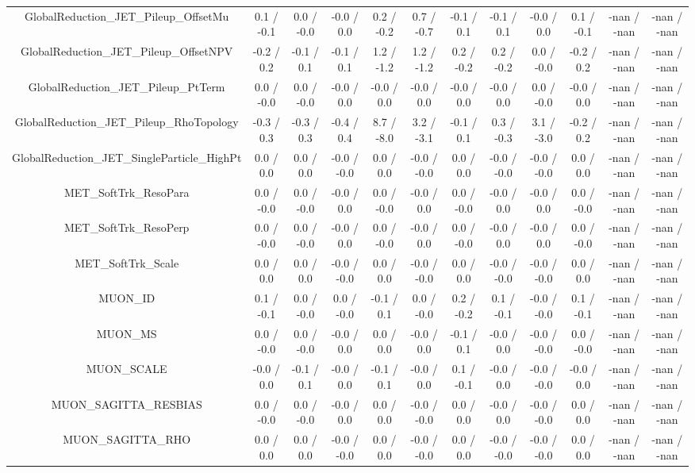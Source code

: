 \begin{table}[htbp]
\begin{center}
\begin{tabular}{|c|c|c|c|c|c|c|c|c|c|c|c|}
  GlobalReduction_JET_Pileup_OffsetMu & 0.1 / -0.1 & 0.0 / -0.0 & -0.0 / 0.0 & 0.2 / -0.2 & 0.7 / -0.7 & -0.1 / 0.1 & -0.1 / 0.1 & -0.0 / 0.0 & 0.1 / -0.1 & -nan / -nan & -nan / -nan \\ 
  GlobalReduction_JET_Pileup_OffsetNPV & -0.2 / 0.2 & -0.1 / 0.1 & -0.1 / 0.1 & 1.2 / -1.2 & 1.2 / -1.2 & 0.2 / -0.2 & 0.2 / -0.2 & 0.0 / -0.0 & -0.2 / 0.2 & -nan / -nan & -nan / -nan \\ 
  GlobalReduction_JET_Pileup_PtTerm & 0.0 / -0.0 & 0.0 / -0.0 & -0.0 / 0.0 & -0.0 / 0.0 & -0.0 / 0.0 & -0.0 / 0.0 & -0.0 / 0.0 & 0.0 / -0.0 & -0.0 / 0.0 & -nan / -nan & -nan / -nan \\ 
  GlobalReduction_JET_Pileup_RhoTopology & -0.3 / 0.3 & -0.3 / 0.3 & -0.4 / 0.4 & 8.7 / -8.0 & 3.2 / -3.1 & -0.1 / 0.1 & 0.3 / -0.3 & 3.1 / -3.0 & -0.2 / 0.2 & -nan / -nan & -nan / -nan \\ 
  GlobalReduction_JET_SingleParticle_HighPt & 0.0 / 0.0 & 0.0 / 0.0 & -0.0 / -0.0 & 0.0 / 0.0 & -0.0 / -0.0 & 0.0 / 0.0 & -0.0 / -0.0 & -0.0 / -0.0 & 0.0 / 0.0 & -nan / -nan & -nan / -nan \\ 
  MET_SoftTrk_ResoPara & 0.0 / -0.0 & 0.0 / -0.0 & -0.0 / 0.0 & 0.0 / -0.0 & -0.0 / 0.0 & 0.0 / -0.0 & -0.0 / 0.0 & -0.0 / 0.0 & 0.0 / -0.0 & -nan / -nan & -nan / -nan \\ 
  MET_SoftTrk_ResoPerp & 0.0 / -0.0 & 0.0 / -0.0 & -0.0 / 0.0 & 0.0 / -0.0 & -0.0 / 0.0 & 0.0 / -0.0 & -0.0 / 0.0 & -0.0 / 0.0 & 0.0 / -0.0 & -nan / -nan & -nan / -nan \\ 
  MET_SoftTrk_Scale & 0.0 / 0.0 & 0.0 / 0.0 & -0.0 / -0.0 & 0.0 / 0.0 & -0.0 / -0.0 & 0.0 / 0.0 & -0.0 / -0.0 & -0.0 / -0.0 & 0.0 / 0.0 & -nan / -nan & -nan / -nan \\ 
  MUON_ID & 0.1 / -0.1 & 0.0 / -0.0 & 0.0 / -0.0 & -0.1 / 0.1 & 0.0 / -0.0 & 0.2 / -0.2 & 0.1 / -0.1 & -0.0 / -0.0 & 0.1 / -0.1 & -nan / -nan & -nan / -nan \\ 
  MUON_MS & 0.0 / -0.0 & 0.0 / -0.0 & -0.0 / 0.0 & 0.0 / 0.0 & -0.0 / 0.0 & -0.1 / 0.1 & -0.0 / 0.0 & -0.0 / -0.0 & 0.0 / -0.0 & -nan / -nan & -nan / -nan \\ 
  MUON_SCALE & -0.0 / 0.0 & -0.1 / 0.1 & -0.0 / 0.0 & -0.1 / 0.1 & -0.0 / 0.0 & 0.1 / -0.1 & -0.0 / 0.0 & -0.0 / -0.0 & -0.0 / 0.0 & -nan / -nan & -nan / -nan \\ 
  MUON_SAGITTA_RESBIAS & 0.0 / -0.0 & 0.0 / -0.0 & -0.0 / 0.0 & 0.0 / 0.0 & -0.0 / -0.0 & 0.0 / 0.0 & -0.0 / 0.0 & -0.0 / -0.0 & 0.0 / 0.0 & -nan / -nan & -nan / -nan \\ 
  MUON_SAGITTA_RHO & 0.0 / 0.0 & 0.0 / 0.0 & -0.0 / -0.0 & 0.0 / 0.0 & -0.0 / -0.0 & 0.0 / 0.0 & -0.0 / -0.0 & -0.0 / -0.0 & 0.0 / 0.0 & -nan / -nan & -nan / -nan \\ 

\end{tabular}
\end{center}
\end{table}
